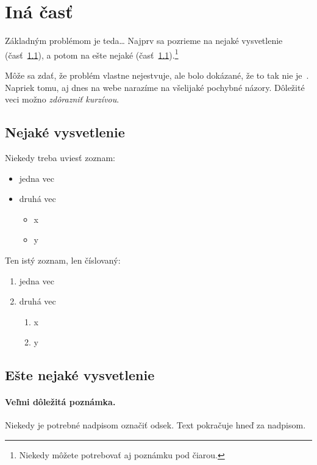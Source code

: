 \documentclass[10pt,twoside,slovak,a4paper]{article}
\begin{document}
\section{Iná časť} \label{ina}

Základným problémom je teda\ldots{} Najprv sa pozrieme na nejaké vysvetlenie (časť~\ref{ina:nejake}), a potom na ešte nejaké (časť~\ref{ina:nejake}).\footnote{Niekedy môžete potrebovať aj poznámku pod čiarou.}

Môže sa zdať, že problém vlastne nejestvuje\cite{Coplien:MPD}, ale bolo dokázané, že to tak nie je~\cite{Czarnecki:Staged, Czarnecki:Progress}. Napriek tomu, aj dnes na webe narazíme na všelijaké pochybné názory\cite{PLP-Framework}. Dôležité veci možno \emph{zdôrazniť kurzívou}.


\subsection{Nejaké vysvetlenie} \label{ina:nejake}

Niekedy treba uviesť zoznam:

\begin{itemize}
\item jedna vec
\item druhá vec
	\begin{itemize}
	\item x
	\item y
	\end{itemize}
\end{itemize}

Ten istý zoznam, len číslovaný:

\begin{enumerate}
\item jedna vec
\item druhá vec
	\begin{enumerate}
	\item x
	\item y
	\end{enumerate}
\end{enumerate}


\subsection{Ešte nejaké vysvetlenie} \label{ina:este}

\paragraph{Veľmi dôležitá poznámka.}
Niekedy je potrebné nadpisom označiť odsek. Text pokračuje hneď za nadpisom.
\end{document}

